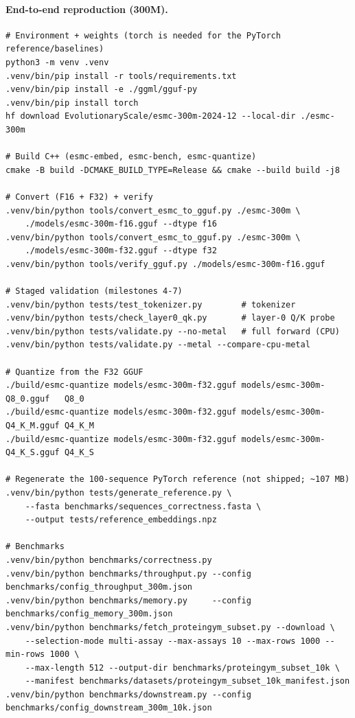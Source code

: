 \documentclass{article}
\begin{document}
\paragraph{End-to-end reproduction (300M).}
\begin{verbatim}
# Environment + weights (torch is needed for the PyTorch reference/baselines)
python3 -m venv .venv
.venv/bin/pip install -r tools/requirements.txt
.venv/bin/pip install -e ./ggml/gguf-py
.venv/bin/pip install torch
hf download EvolutionaryScale/esmc-300m-2024-12 --local-dir ./esmc-300m

# Build C++ (esmc-embed, esmc-bench, esmc-quantize)
cmake -B build -DCMAKE_BUILD_TYPE=Release && cmake --build build -j8

# Convert (F16 + F32) + verify
.venv/bin/python tools/convert_esmc_to_gguf.py ./esmc-300m \
    ./models/esmc-300m-f16.gguf --dtype f16
.venv/bin/python tools/convert_esmc_to_gguf.py ./esmc-300m \
    ./models/esmc-300m-f32.gguf --dtype f32
.venv/bin/python tools/verify_gguf.py ./models/esmc-300m-f16.gguf

# Staged validation (milestones 4-7)
.venv/bin/python tests/test_tokenizer.py        # tokenizer
.venv/bin/python tests/check_layer0_qk.py       # layer-0 Q/K probe
.venv/bin/python tests/validate.py --no-metal   # full forward (CPU)
.venv/bin/python tests/validate.py --metal --compare-cpu-metal

# Quantize from the F32 GGUF
./build/esmc-quantize models/esmc-300m-f32.gguf models/esmc-300m-Q8_0.gguf   Q8_0
./build/esmc-quantize models/esmc-300m-f32.gguf models/esmc-300m-Q4_K_M.gguf Q4_K_M
./build/esmc-quantize models/esmc-300m-f32.gguf models/esmc-300m-Q4_K_S.gguf Q4_K_S

# Regenerate the 100-sequence PyTorch reference (not shipped; ~107 MB)
.venv/bin/python tests/generate_reference.py \
    --fasta benchmarks/sequences_correctness.fasta \
    --output tests/reference_embeddings.npz

# Benchmarks
.venv/bin/python benchmarks/correctness.py
.venv/bin/python benchmarks/throughput.py --config benchmarks/config_throughput_300m.json
.venv/bin/python benchmarks/memory.py     --config benchmarks/config_memory_300m.json
.venv/bin/python benchmarks/fetch_proteingym_subset.py --download \
    --selection-mode multi-assay --max-assays 10 --max-rows 1000 --min-rows 1000 \
    --max-length 512 --output-dir benchmarks/proteingym_subset_10k \
    --manifest benchmarks/datasets/proteingym_subset_10k_manifest.json
.venv/bin/python benchmarks/downstream.py --config benchmarks/config_downstream_300m_10k.json
\end{verbatim}
\end{document}

